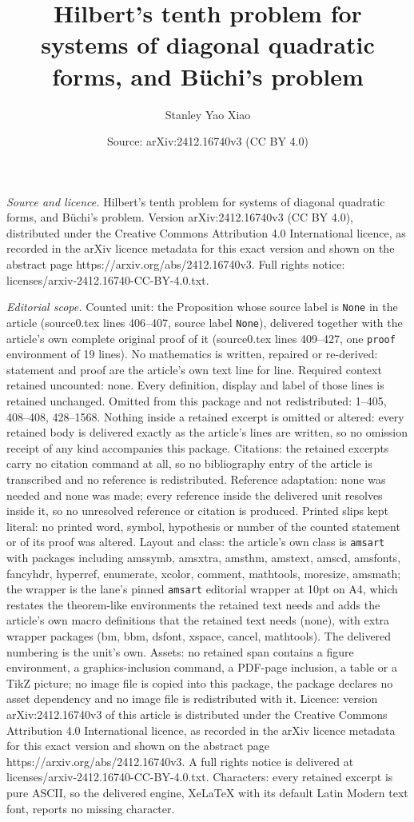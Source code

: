 \documentclass[10pt,a4paper]{amsart}
\title[Hilbert's tenth problem for systems of diagonal quadratic fo]{Hilbert's tenth problem for systems of diagonal quadratic forms, and B\"{u}chi's problem}
\author{Stanley Yao Xiao}
\date{Source: arXiv:2412.16740v3 (CC BY 4.0)}
\begin{document}
\maketitle

\noindent\emph{Source and licence.} Hilbert's tenth problem for systems of diagonal quadratic forms, and B\"{u}chi's problem. Version arXiv:2412.16740v3 (CC BY 4.0), distributed under the Creative Commons Attribution 4.0 International licence, as recorded in the arXiv licence metadata for this exact version and shown on the abstract page https://arxiv.org/abs/2412.16740v3. Full rights notice: licenses/arxiv-2412.16740-CC-BY-4.0.txt.\par\smallskip

\noindent\textit{Editorial scope.} Counted unit: the Proposition whose source label is \texttt{None} in the article (source0.tex lines 406--407, source label \texttt{None}), delivered together with the article's own complete original proof of it (source0.tex lines 409--427, one \texttt{proof} environment of 19 lines). No mathematics is written, repaired or re-derived: statement and proof are the article's own text line for line. Required context retained uncounted: none. Every definition, display and label of those lines is retained unchanged. Omitted from this package and not redistributed: 1--405, 408--408, 428--1568. Nothing inside a retained excerpt is omitted or altered: every retained body is delivered exactly as the article's lines are written, so no omission receipt of any kind accompanies this package. Citations: the retained excerpts carry no citation command at all, so no bibliography entry of the article is transcribed and no reference is redistributed. Reference adaptation: none was needed and none was made; every reference inside the delivered unit resolves inside it, so no unresolved reference or citation is produced. Printed slips kept literal: no printed word, symbol, hypothesis or number of the counted statement or of its proof was altered. Layout and class: the article's own class is \texttt{amsart} with packages including amssymb, amsxtra, amsthm, amstext, amscd, amsfonts, fancyhdr, hyperref, enumerate, xcolor, comment, mathtools, moresize, amsmath; the wrapper is the lane's pinned \texttt{amsart} editorial wrapper at 10pt on A4, which restates the theorem-like environments the retained text needs and adds the article's own macro definitions that the retained text needs (none), with extra wrapper packages (bm, bbm, dsfont, xspace, cancel, mathtools). The delivered numbering is the unit's own. Assets: no retained span contains a figure environment, a graphics-inclusion command, a PDF-page inclusion, a table or a TikZ picture; no image file is copied into this package, the package declares no asset dependency and no image file is redistributed with it. Licence: version arXiv:2412.16740v3 of this article is distributed under the Creative Commons Attribution 4.0 International licence, as recorded in the arXiv licence metadata for this exact version and shown on the abstract page https://arxiv.org/abs/2412.16740v3. A full rights notice is delivered at licenses/arxiv-2412.16740-CC-BY-4.0.txt. Characters: every retained excerpt is pure ASCII, so the delivered engine, XeLaTeX with its default Latin Modern text font, reports no missing character.
\end{document}
